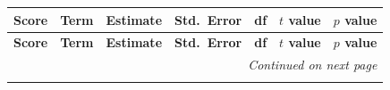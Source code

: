 \documentclass{wiley-article}
\begin{document}
{\scriptsize                %
\setlength{\tabcolsep}{4pt} %

\begin{longtable}{@{}l p{} rrrrr@{}}
  \label{tab:lme_fixed} \\

  \toprule
  \textbf{Score} & \textbf{Term} & \textbf{Estimate} &
  \textbf{Std.\ Error} & \textbf{df} &
  \textbf{$t$ value} & \textbf{$p$ value} \\
  \midrule
  \endfirsthead

  \toprule
  \textbf{Score} & \textbf{Term} & \textbf{Estimate} &
  \textbf{Std.\ Error} & \textbf{df} &
  \textbf{$t$ value} & \textbf{$p$ value} \\
  \midrule
  \endhead

  \midrule \multicolumn{7}{r}{\scriptsize\itshape Continued on next page}\\
  \endfoot
  \bottomrule
  \endlastfoot


\end{longtable}}
\end{document}
